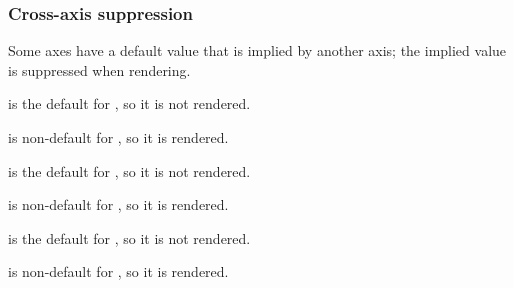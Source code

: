 \subsubsection{Cross-axis suppression\label{Oxcaml--cross-axis-suppression}}%
Some axes have a default value that is implied by another axis; the implied value is suppressed when rendering.

\label{Oxcaml--val-mode_local_yielding}\begin{ocamlindent} is the default for , so it is not rendered.\end{ocamlindent}%
\medbreak
\label{Oxcaml--val-mode_local_unyielding}\begin{ocamlindent} is non-default for , so it is rendered.\end{ocamlindent}%
\medbreak
\label{Oxcaml--val-mode_immutable_contended}\begin{ocamlindent} is the default for , so it is not rendered.\end{ocamlindent}%
\medbreak
\label{Oxcaml--val-mode_immutable_uncontended}\begin{ocamlindent} is non-default for , so it is rendered.\end{ocamlindent}%
\medbreak
\label{Oxcaml--val-mode_stateless_portable}\begin{ocamlindent} is the default for , so it is not rendered.\end{ocamlindent}%
\medbreak
\label{Oxcaml--val-mode_stateful_portable}\begin{ocamlindent} is non-default for , so it is rendered.\end{ocamlindent}%
\medbreak
